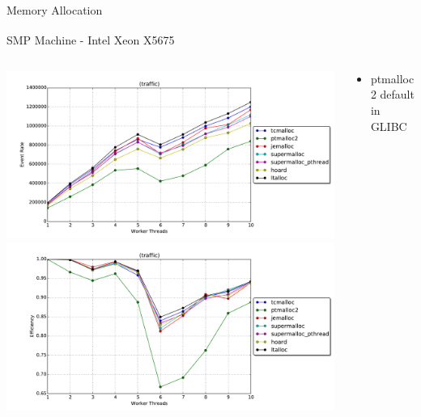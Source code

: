 \documentclass[10pt]{beamer}
\begin{document}
\begin{frame}{Memory Allocation}
    \begin{block}{SMP Machine - Intel\textsuperscript{\textregistered} Xeon\textsuperscript{\textregistered} X5675}
        \begin{columns}
        \begin{column}{0.5\textwidth}
            \smallskip
            \includegraphics[width=\textwidth]{../figs/memory_allocation/traffic_eventrate.pdf} \\
            \includegraphics[width=\textwidth]{../figs/memory_allocation/traffic_efficiency.pdf} \\
        \end{column}
        \begin{column}{0.5\textwidth}
            \begin{itemize}
                \item ptmalloc2 default in GLIBC
            \end{itemize}
        \end{column}
        \end{columns}
    \end{block}
\end{frame}
\end{document}
